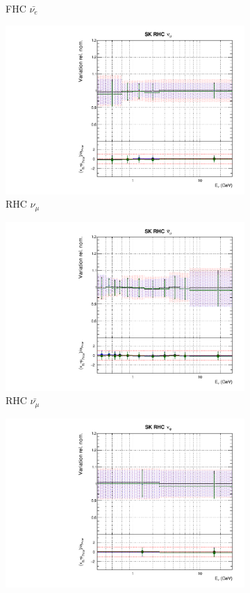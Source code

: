 \begin{figure}[!htbp]
\begin{subfigure}{0.45\textwidth}
  \caption{\SK FHC $\bar{\nu_{e}}$}
\end{subfigure}
\begin{subfigure}{0.45\textwidth}
  \centering
  \includegraphics[width=0.75\linewidth]{figs/polyasmvsflux_12}
  \caption{\SK RHC $\nu_{\mu}$}
\end{subfigure}
\begin{subfigure}{0.45\textwidth}
  \centering
  \includegraphics[width=0.75\linewidth]{figs/polyasmvsflux_13}
  \caption{\SK RHC $\bar{\nu_{\mu}}$}
\end{subfigure}
\begin{subfigure}{0.45\textwidth}
  \centering
  \includegraphics[width=0.75\linewidth]{figs/polyasmvsflux_14}

\end{subfigure}
\end{figure}
